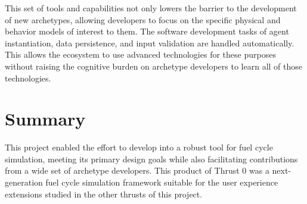 This set of tools and capabilities not only lowers the barrier to the
development of new archetypes, allowing developers to focus on the specific
physical and behavior models of interest to them.  The software development
tasks of agent instantiation, data persistence, and input validation are
handled automatically.  This allows the \Cyclus ecosystem to use advanced
technologies for these purposes without raising the cognitive burden on
archetype developers to learn all of those technologies.

\section{Summary}

This project enabled the \Cyclus effort to develop into a robust tool for fuel
cycle simulation, meeting its primary design goals while also facilitating
contributions from a wide set of archetype developers.  This product of Thrust
0 was a next-generation fuel cycle simulation framework suitable for the user
experience extensions studied in the other thrusts of this project.
